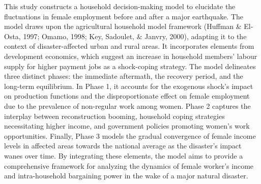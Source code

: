 \documentclass[a4paper,12pt]{article}
\begin{document}
This study constructs a household decision-making model to elucidate the fluctuations in female employment before and after a major earthquake. The model draws upon the agricultural household model framework (Huffman \& El-Osta, 1997; Omamo, 1998; Key, Sadoulet, \& Janvry, 2000), adapting it to the context of disaster-affected urban and rural areas. It incorporates elements from development economics, which suggest an increase in household members' labour supply for higher payment jobs as a shock-coping strategy.
The model delineates three distinct phases: the immediate aftermath, the recovery period, and the long-term equilibrium. In Phase 1, it accounts for the exogenous shock's impact on production functions and the disproportionate effect on female employment due to the prevalence of non-regular work among women. Phase 2 captures the interplay between reconstruction booming, household coping strategies necessitating higher income, and government policies promoting women's work opportunities. Finally, Phase 3 models the gradual convergence of female income levels in affected areas towards the national average as the disaster's impact wanes over time.
By integrating these elements, the model aims to provide a comprehensive framework for analyzing the dynamics of female worker's income and intra-household bargaining power in the wake of a major natural disaster.

\clearpage
\appendix

\vspace*{0.5in} %
\noindent{}

\renewcommand{\thesubsection}{\Alph{subsection}}

\vspace{1em} %

\end{document}
